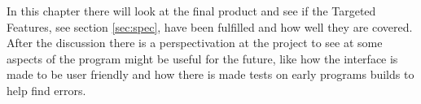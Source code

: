 In this chapter there will look at the final product and see if the Targeted Features, see section \ref{sec:spec}, have been fulfilled and how well they are covered. After the discussion there is a perspectivation at the project to see at some aspects of the program might be useful for the future, like how the interface is made to be user friendly and how there is made tests on early programs builds to help find errors.